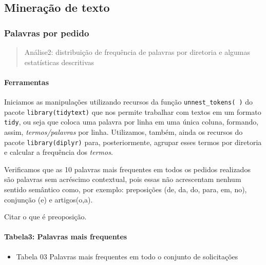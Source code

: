\documentclass[]{article}
\providecommand{\tightlist}{%
  \setlength{\itemsep}{0pt}\setlength{\parskip}{0pt}}
\let\oldparagraph\paragraph
\renewcommand{\paragraph}[1]{\oldparagraph{#1}\mbox{}}
\begin{document}
\hypertarget{mineracao-de-texto}{%
\subsection{Mineração de texto}\label{mineracao-de-texto}}

\hypertarget{palavras-por-pedido}{%
\subsubsection{Palavras por pedido}\label{palavras-por-pedido}}

\begin{quote}
Análise2: distribuição de frequência de palavras por diretoria e algumas
estatísticas descritivas
\end{quote}

\hypertarget{ferramentas}{%
\paragraph{Ferramentas}\label{ferramentas}}

Iniciamos as manipulações utilizando recursos da função
\texttt{unnest\_tokens(\ )} do pacote \texttt{library(tidytext)} que nos
permite trabalhar com textos em um formato \texttt{tidy}, ou seja que
coloca uma palavra por linha em uma única coluna, formando, assim,
\emph{termos/palavras} por linha. Utilizamos, também, ainda os recursos
do pacote \texttt{library(diplyr)} para, posteriormente, agrupar esses
termos por diretoria e calcular a frequência dos \emph{termos}.

Verificamos que as 10 palavras mais frequentes em todos os pedidos
realizados são palavras sem acréscimo contextual, pois essas não
acrescentam nenhum sentido semântico como, por exemplo: preposições (de,
da, do, para, em, no), conjunção (e) e artigos(o,a).

Citar o que é preoposição.

\hypertarget{tabela3-palavras-mais-frequentes}{%
\paragraph{Tabela3: Palavras mais
frequentes}\label{tabela3-palavras-mais-frequentes}}

\begin{itemize}
\tightlist
\item
  Tabela 03 Palavras mais frequentes em todo o conjunto de solicitações
\end{itemize}
\end{document}
